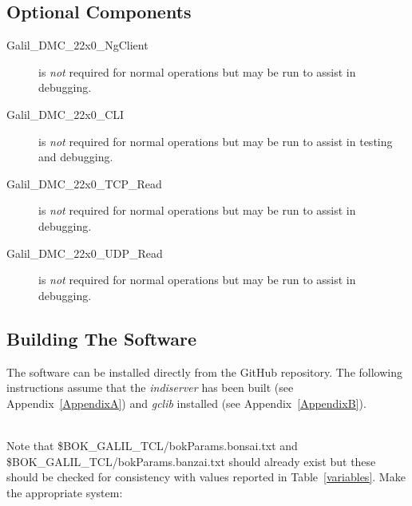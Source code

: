 \documentclass[12pt,twoside]{article}
\begin{document}
\subsection{Optional Components}
\label{optionalcomponents}

\begin{description}
 \item[Galil\_DMC\_22x0\_NgClient] is \emph{not} required for normal operations but may be run to assist in debugging.
 \item[Galil\_DMC\_22x0\_CLI] is \emph{not} required for normal operations but may be run to assist in testing and debugging.
 \item[Galil\_DMC\_22x0\_TCP\_Read] is \emph{not} required for normal operations but may be run to assist in debugging.
 \item[Galil\_DMC\_22x0\_UDP\_Read] is \emph{not} required for normal operations but may be run to assist in debugging.
\end{description}

\subsection{Building The Software}
\label{buildingthesoftware}

\noindent The software can be installed directly from the GitHub repository. The following instructions assume that
the \emph{indiserver} has been built (see Appendix~\ref{AppendixA}) and \emph{gclib} installed (see Appendix~\ref{AppendixB}). \\







 \\

\noindent Note that \$BOK\_GALIL\_TCL/bokParams.bonsai.txt and \$BOK\_GALIL\_TCL/bokParams.banzai.txt should already exist 
but these should be checked for consistency with values reported in Table~\ref{variables}. Make the appropriate system: \\

\end{document}
